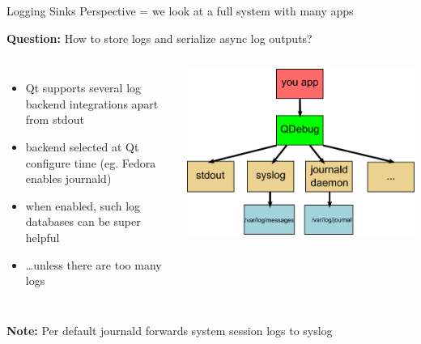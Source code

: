 \documentclass[t,compress,aspectratio=169]{beamer}
\begin{document}
\begin{frame}
    {Logging Sinks}
    {Perspective = we look at a full system with many apps}

    \textbf{Question:} How to store logs and serialize async log outputs?
    \begin{columns}
    \begin{itemize}
        \item Qt supports several log backend integrations apart from stdout
        \item backend selected at Qt configure time (eg. Fedora enables journald)
        \item when enabled, such log databases can be super helpful
        \item \dots unless there are too many logs
    \end{itemize}

    \includegraphics[width=.9\textwidth]{logsinks}
    \end{columns}
    \medskip

    \textbf{Note:} Per default journald forwards system session logs to syslog
\end{frame}
\end{document}
